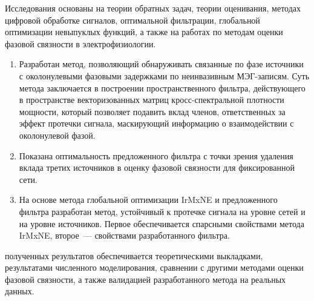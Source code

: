 {\methods}
Исследования основаны на теории обратных задач, теории оценивания,
методах цифровой обработке сигналов, оптимальной фильтрации,
глобальной оптимизации невыпуклых функций, а также на работах
по методам оценки фазовой связности в электрофизиологии.



{}
\begin{enumerate}
  \item Разработан метод, позволяющий обнаруживать связанные по фазе источники с околонулевыми фазовыми задержками
      по неинвазивным МЭГ-записям. Суть метода заключается в построении пространственного фильтра,
      действующего в пространстве векторизованных матриц кросс-спектральной плотности мощности,
      который позволяет подавить вклад членов, ответственных за эффект протечки сигнала, маскирующий
      информацию о взаимодействии с околонулевой фазой.
  \item Показана оптимальность предложенного фильтра с точки зрения удаления вклада третих источников
      в оценку фазовой связности для фиксированной сети.
  \item На основе метода глобальной оптимизации IrMxNE и предложенного фильтра разработан метод,
      устойчивый к протечке сигнала на уровне сетей и на уровне источников. Первое обеспечивается
      спарсными свойствами метода IrMxNE, второе~--- свойствами разработанного фильтра.
\end{enumerate}

{\reliability} полученных результатов обеспечивается теоретическими выкладками, результатами численного моделирования,
сравнении с другими методами оценки фазовой связности, а также
валидацией разработанного метода на реальных данных.

{\probation}

